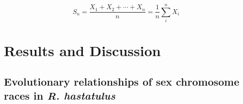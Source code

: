 \documentclass[9pt,twocolumn,twoside]{gsajnl}
\begin{document}
\begin{equation}
S_n = \frac{X_1 + X_2 + \cdots + X_n}{n}
      = \frac{1}{n}\sum_{i}^{n} X_i
\label{eq:refname1}
\end{equation}


\section*{Results and Discussion}

\subsection*{Evolutionary relationships of sex chromosome races in \textit{R. hastatulus}}


\end{document}
